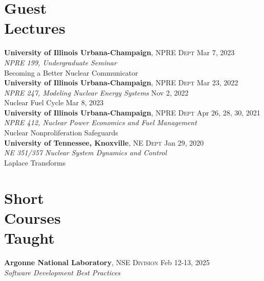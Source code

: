 \documentclass[margin,line]{resume}
\begin{document}
\begin{resume}
    \section{\mysidestyle Guest\\Lectures}
    \textbf{University of Illinois Urbana-Champaign}, \textsc{NPRE Dept} \hfill Mar 7, 2023\\
    \textsl{NPRE 199, Undergraduate Seminar} \\
    Becoming a Better Nuclear Communicator \vspace{1.5mm}\\    
    \textbf{University of Illinois Urbana-Champaign}, \textsc{NPRE Dept} \hfill Mar 23, 2022\\
    \textsl{NPRE 247, Modeling Nuclear Energy Systems} \hfill Nov 2, 2022\\
        Nuclear Fuel Cycle \hfill Mar 8, 2023 \vspace{1.5mm}\\
    \textbf{University of Illinois Urbana-Champaign}, \textsc{NPRE Dept} \hfill Apr 26, 28, 30, 2021\\
    \textsl{NPRE 412, Nuclear Power Economics and Fuel Management} \\
        Nuclear Nonproliferation Safeguards \vspace{1.5mm}\\
    \textbf{University of Tennessee, Knoxville}, \textsc{NE Dept} \hfill Jan 29, 2020\\
    \textsl{NE 351/357 Nuclear System Dynamics and Control} \\
        Laplace Transforms
    \section{\mysidestyle Short\\Courses\\Taught}
    \textbf{Argonne National Laboratory}, \textsc{NSE Division} \hfill Feb 12-13, 2025\\
    \textsl{Software Development Best Practices}

\end{resume}
\end{document}
